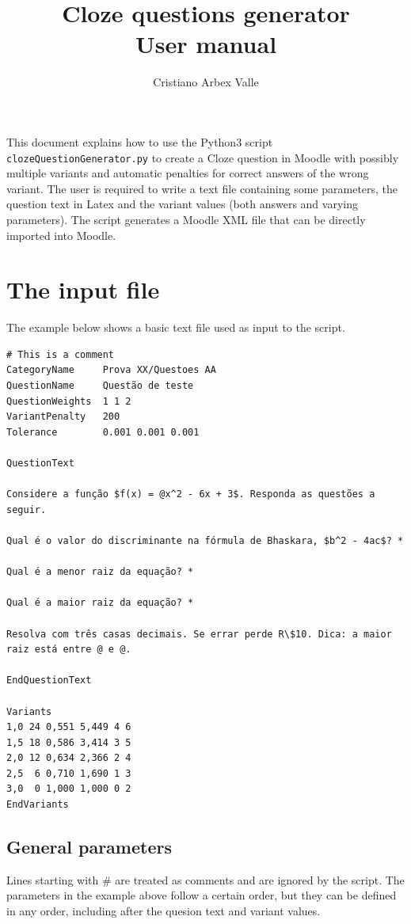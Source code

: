 \documentclass[11pt]{article}
\title{Cloze questions generator\\ \bf{User manual}}
\author{Cristiano Arbex Valle}
\date{}
\begin{document}
\maketitle

This document explains how to use the Python3 script \texttt{clozeQuestionGenerator.py} to create a Cloze question in Moodle with possibly multiple variants and automatic penalties for correct answers of the wrong variant. The user is required to write a text file containing some parameters, the question text in Latex and the variant values (both answers and varying parameters). The script generates a Moodle XML file that can be directly imported into Moodle.

\section{The input file}

The example below shows a basic text file used as input to the script.

\begin{verbatim}
# This is a comment
CategoryName     Prova XX/Questoes AA
QuestionName     Questão de teste
QuestionWeights  1 1 2
VariantPenalty   200
Tolerance        0.001 0.001 0.001

QuestionText

Considere a função $f(x) = @x^2 - 6x + 3$. Responda as questões a seguir.

Qual é o valor do discriminante na fórmula de Bhaskara, $b^2 - 4ac$? *

Qual é a menor raiz da equação? *

Qual é a maior raiz da equação? *

Resolva com três casas decimais. Se errar perde R\$10. Dica: a maior raiz está entre @ e @.

EndQuestionText

Variants
1,0 24 0,551 5,449 4 6
1,5 18 0,586 3,414 3 5
2,0 12 0,634 2,366 2 4
2,5  6 0,710 1,690 1 3
3,0  0 1,000 1,000 0 2
EndVariants
\end{verbatim}

\subsection{General parameters}

Lines starting with \# are treated as comments and are ignored by the script. The parameters in the example above follow a certain order, but they can be defined in any order, including after the quesion text and variant values.
\end{document}
